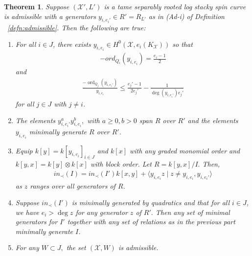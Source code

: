 \documentclass{amsart}
\theoremstyle{plain}
\newtheorem{thm}{Theorem}[section]
\theoremstyle{definition}
\theoremstyle{remark}
\numberwithin{equation}{section}
\newcommand \sx{\mathscr X}
\DeclareMathOperator{\ord}{ord}
\newcommand \subhalf[1]{\frac{{#1} - 1}{2{#1}}}
\begin{document}
\begin{thm}
\label{thm:ramification_order_induction}
Suppose $(\sx',L')$ is a tame separably rooted log stacky spin curve is admissible with a generators $y_{i,e_i'} \in R' = R_{L'}$ as in (Ad-i) of Definition ~\ref{defn:admissible}. Then the following are true:
\begin{enumerate}
	\item[(a)] For all $i \in J$, there exists $y_{i,e_i} \in H^0(\sx, e_i(K_\sx))$ so that
	\begin{align*}
	-ord_{Q_i}(y_{i,e_i}) = \frac{e_i-1}{2}
\end{align*}
and
\begin{align*}
	\frac{-\ord_{Q_j}(y_{i,e_i'})}{y_{i,e_i}} \leq \subhalf{e_j'}-\frac{1}{\deg(y_{i,e_i'})e_j'}
\end{align*}
for all $j \in J$ with $j \neq i$.
\item[(b)] The elements $y_{i,e_i'}^ay_{i,e_i}^b,$ with $a \geq 0, b > 0$ span $R$ over $R'$ and the elements $y_{i,e_i}$ minimally generate $R$ over $R'$.
\item[(c)] Equip $k[y] = k[y_{i,e_i}]_{i \in J}$ and $k[x]$ with any graded monomial order and $k[y,x] = k[y] \otimes k[x]$ with block order. Let $R = k[y,x]/I.$ Then,
\begin{align*}
	in_\prec(I) = in_\prec(I')k[x,y] + \langle y_{i,e_i}z \mid z \neq y_{i,e_i},y_{i,e_i'} \rangle 
\end{align*}
	as $z$ ranges over all generators of $R$.
	\item[(d)] Suppose $in_\prec(I')$ is minimally generated by quadratics and that for all $i \in J$, we have $e_i > \deg z$ for any generator $z$ of $R'.$ Then any set of minimal generators for $I'$ together with any set of relations as in the previous part  minimally generate $I$.
	\item[(e)] For any $W \subset J,$ the set $(\sx,W)$ is admissible.
\end{enumerate}
\end{thm}
\end{document}

